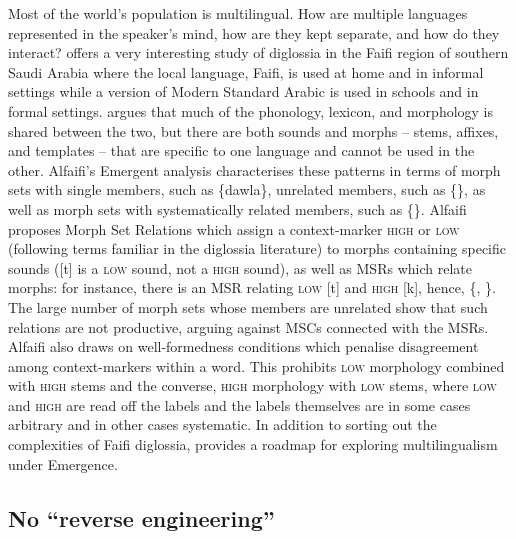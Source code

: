 Most of the world's population is multilingual. How are multiple languages represented in the speaker's mind, how are they kept separate, and how do they interact? \citet{Alfaifi:2020phd} offers a very interesting study of diglossia in the Faifi region of southern Saudi Arabia where the local language, Faifi, is used at home and in informal settings while a version of Modern Standard Arabic is used in schools and in formal settings. \citet{Alfaifi:2020phd} argues that much of the phonology, lexicon,  and morphology is shared between the two, but there are both  sounds and morphs --  stems, affixes, and templates -- that are specific to one language and cannot be used in the other. Alfaifi's Emergent analysis characterises these patterns in terms of morph sets with single members, such as \{dawla\}, unrelated members, such as \{\}, as well as morph sets with systematically related members, such as \{\}. Alfaifi proposes Morph Set Relations which assign a context-marker \textsc{high} or \textsc{low} (following terms familiar in the diglossia literature) to morphs containing specific sounds ([t] is a \textsc{low} sound, not a \textsc{high} sound), as well as MSRs which relate morphs: for instance, there is an MSR relating \textsc{low} [t] and \textsc{high} [k], hence, \{, \}. The large number of morph sets whose members are unrelated show that such relations are not productive, arguing against MSCs connected with the MSRs. Alfaifi also draws on well-formedness conditions which penalise disagreement among context-markers within a word. This prohibits \textsc{low} morphology combined with \textsc{high} stems and the converse, \textsc{high} morphology with \textsc{low} stems, where \textsc{low} and \textsc{high} are read off the labels and the labels themselves are in some cases arbitrary and in other cases systematic. In addition to sorting out the complexities of Faifi diglossia, \citet{Alfaifi:2020phd} provides a roadmap for exploring multilingualism under Emergence.

\subsection{No ``reverse engineering''}\largerpage

